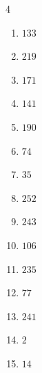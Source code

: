 \begin{multicols}{4}
\begin{enumerate}
  \item $133$


  \item $219$


  \item $171$


  \item $141$


  \item $190$


  \item $74$


  \item $35$


  \item $252$


  \item $243$


  \item $106$


  \item $235$


\columnbreak %

\resetques

  \item $77$


  \item $241$


  \item $2$


  \item $14$



\end{enumerate}
\end{multicols}
